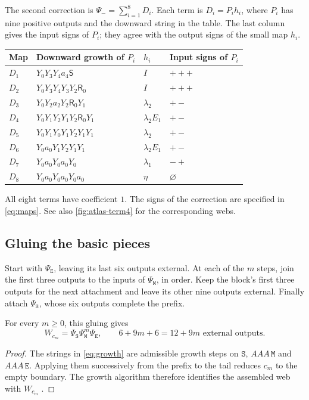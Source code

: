\documentclass[a4paper,11pt]{amsart}
\newcommand{\wordstart}{\mathtt{S}}
\newcommand{\wordmiddle}{\mathtt{M}}
\newcommand{\wordend}{\mathtt{E}}
\newcommand{\startmap}{{\Psi}_{{\wordstart}}}
\newcommand{\middlemap}{{\Psi}_{{\wordmiddle}}}
\newcommand{\finishmap}{{\Psi}_{{\wordend}}}
\newcommand{\removemap}{{\Psi}_-}
\numberwithin{equation}{subsection}
\theoremstyle{plain}
\theoremstyle{definition}
\theoremstyle{remark}
\begin{document}
The second correction is $\removemap=\sum_{i=1}^8D_i$. Each term is
$D_i=P_i h_i$, where $P_i$ has nine positive outputs and the downward
string in the table. The last column gives the input signs of $P_i$;
they agree with the output signs of the small map $h_i$.
\begin{center}\small
\begin{tabular}{llll}
\toprule
Map&Downward growth of $P_i$&$h_i$&Input signs of $P_i$\\\midrule
$D_1$&$Y_0Y_3Y_4a_4\mathsf S$&$I$&$+++$\\
$D_2$&$Y_0Y_3Y_4Y_3Y_2\mathsf R_0$&$I$&$+++$\\
$D_3$&$Y_0Y_2a_2Y_2\mathsf R_0Y_1$&$\lambda_2$&$+-$\\
$D_4$&$Y_0Y_1Y_2Y_1Y_2\mathsf R_0Y_1$&$\lambda_2E_1$&$+-$\\
$D_5$&$Y_0Y_1Y_0Y_1Y_2Y_1Y_1$&$\lambda_2$&$+-$\\
$D_6$&$Y_0a_0Y_1Y_2Y_1Y_1$&$\lambda_2E_1$&$+-$\\
$D_7$&$Y_0a_0Y_0a_0Y_0$&$\lambda_1$&$-+$\\
$D_8$&$Y_0a_0Y_0a_0Y_0a_0$&$\eta$&$\varnothing$\\\bottomrule
\end{tabular}
\end{center}
All eight terms have coefficient $1$. The signs of the correction
are specified in \autoref{eq:maps}. See also \autoref{fig:atlas-term4} for the corresponding webs.

\subsection{Gluing the basic pieces}

Start with $\finishmap$, leaving its last six outputs external. At each
of the $m$ steps, join the first three outputs to the inputs of
$\middlemap$, in order. Keep the block's first three outputs for the next
attachment and leave its other nine outputs external. Finally
attach $\startmap$, whose six outputs complete the prefix.

\begin{lemma}
For every $m\ge0$, this gluing gives
\[
W_{c_m}=\startmap\middlemap^m\finishmap,\qquad
6+9m+6=12+9m\text{ external outputs}.
\]
\end{lemma}

\begin{proof}
The strings in \autoref{eq:growth} are admissible growth
steps on $\wordstart$, $AAA\,\wordmiddle$ and $AAA\,\wordend$. Applying them
successively from the prefix to the tail reduces $c_m$ to the empty
boundary. The growth algorithm therefore identifies the assembled
web with $W_{c_m}$ \cite[Section 5, Lemmas 1--3]{KK}.
\end{proof}
\end{document}
